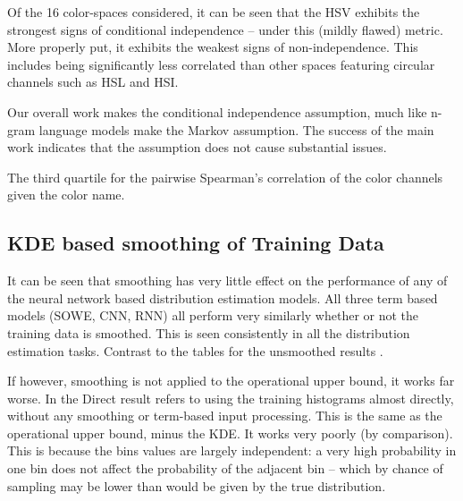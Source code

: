 \documentclass[11pt,a4paper]{article}
\begin{document}
Of the 16 color-spaces considered, it can be seen that the HSV exhibits the strongest signs of conditional independence -- under this (mildly flawed) metric.
More properly put, it exhibits the weakest signs of non-independence.
This includes being significantly less correlated than other spaces featuring circular channels such as HSL and HSI.

Our overall work makes the conditional independence assumption, much like n-gram language models make the Markov assumption.
The success of the main work indicates that the assumption does not cause substantial issues.



\begin{table}
	\caption{\label{tbl:colorcor} The third quartile for the pairwise Spearman's correlation of the color channels given the color name.}
	\centering
\end{table}

\subsection{KDE based smoothing of Training Data}\label{sec:smoothed-results}

It can be seen that smoothing has very little effect on the performance of any of the neural network based distribution estimation models.
All three term based models (SOWE, CNN, RNN) all perform very similarly whether or not the training data is smoothed.
This is seen consistently in all the distribution estimation tasks.
Contrast 
to the tables for the unsmoothed results
.

If however, smoothing is not applied to the operational upper bound, it works far worse.
In   the Direct result refers to using the training histograms almost directly, without any smoothing or term-based input processing.
This is the same as the operational upper bound, minus the KDE.
It works very poorly (by comparison).
This is because the bins values are largely independent: a very high probability in one bin does not affect the probability of the adjacent bin -- which by chance of sampling may be lower than would be given by the true distribution.
\end{document}
